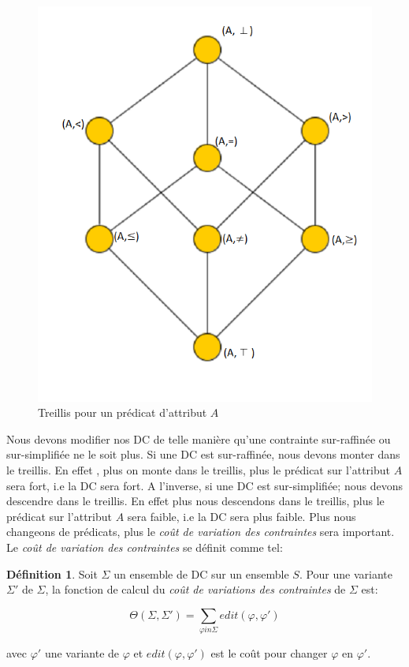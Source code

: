 \documentclass[letterpaper, 12pt]{report}
\theoremstyle{definition}
\newtheorem{mydef}{Définition}
\begin{document}
\begin{figure}
	\centering
	\includegraphics[scale=0.5]{img/treillis}
	\caption{\label{treillis} Treillis pour un prédicat d'attribut $A$}
\end{figure}

Nous devons modifier nos DC de telle manière qu'une contrainte sur-raffinée ou sur-simplifiée ne le soit plus. Si une DC est sur-raffinée, nous devons monter dans le treillis. En effet , plus on monte dans le treillis, plus le prédicat sur l'attribut $A$ sera fort, i.e la DC sera fort. A l'inverse, si une DC est sur-simplifiée; nous devons descendre dans le treillis. En effet plus nous descendons dans le treillis, plus le prédicat sur l'attribut $A$ sera faible, i.e la DC sera plus faible. Plus nous changeons de prédicats, plus le \emph{coût de variation des contraintes} sera important. Le \emph{coût de variation des contraintes} se définit comme tel: 

\begin{mydef}
Soit $\Sigma$ un ensemble de DC sur un ensemble $S$. Pour une variante $\Sigma '$ de $\Sigma$, la fonction de calcul du \emph{coût de variations des contraintes} de $\Sigma$ est:

$$\Theta (\Sigma,\Sigma ') = \sum_{\varphi in \Sigma} edit(\varphi,\varphi ')$$

\hspace*{2cm} avec $\varphi '$ une variante de $\varphi$ et $edit(\varphi,\varphi ')$ est le coût pour changer $\varphi$ en $\varphi'$.
\end{mydef}
\end{document}
